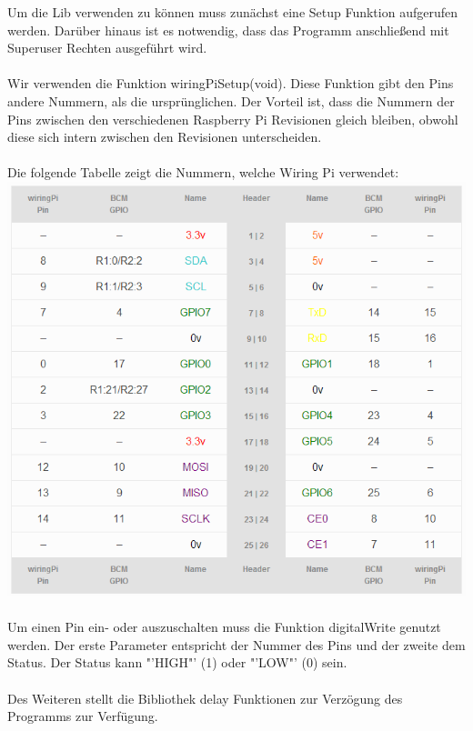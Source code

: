 Um die Lib verwenden zu können muss zunächst eine Setup Funktion aufgerufen werden. Darüber hinaus ist es notwendig, dass das Programm anschließend mit Superuser Rechten ausgeführt wird.\\
\\
Wir verwenden die Funktion wiringPiSetup(void). Diese Funktion gibt den Pins andere Nummern, als die ursprünglichen. Der Vorteil ist, dass die Nummern der Pins zwischen den verschiedenen Raspberry Pi Revisionen gleich bleiben, obwohl diese sich intern zwischen den Revisionen unterscheiden.\\
\\
Die folgende Tabelle zeigt die Nummern, welche Wiring Pi verwendet:\\
\includegraphics{GPIO_Pins.PNG}\\
\\
Um einen Pin ein- oder auszuschalten muss die Funktion digitalWrite genutzt werden. Der erste Parameter entspricht der Nummer des Pins und der zweite dem Status. Der Status kann "'HIGH"' (1) oder "'LOW"' (0) sein.\\
\\
Des Weiteren stellt die Bibliothek delay Funktionen zur Verzögung des Programms zur Verfügung.

